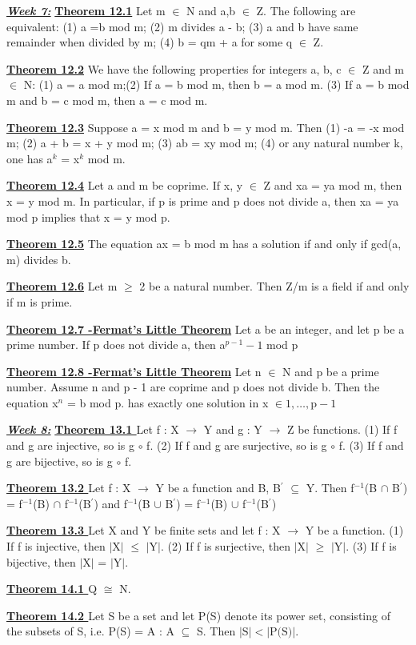 \documentclass[10pt]{article}
\begin{document}
\par\textbf{\underline{\textit{Week 7:}}}
\textbf{\underline{Theorem 12.1}}
Let m $\in$ N and a,b $\in$ Z. The following are equivalent:
(1) a =b mod m; (2) m divides a - b; (3) a and b have same remainder when divided by m; (4) b = qm + a for some q $\in$ Z.
\par\textbf{\underline{Theorem 12.2}}
We have the following properties for integers a, b, c $\in$ Z and m $\in$ N:
(1) a = a mod m;(2) If a = b mod m, then b = a mod m. (3) If a = b mod m and b = c mod m, then a = c mod m.
\par\textbf{\underline{Theorem 12.3}}
Suppose a = x mod m and b = y mod m. Then
(1) -a = -x mod m; (2) a + b = x + y mod m; (3) ab = xy mod m; (4) or any natural number k, one has a$^k$ = x$^k$ mod m.
\par\textbf{\underline{Theorem 12.4}}
Let a and m be coprime. If x, y $\in$ Z and xa = ya mod m, then x = y
mod m. In particular, if p is prime and p does not divide a, then xa = ya mod p implies
that x = y mod p.
\par\textbf{\underline{Theorem 12.5}}
The equation ax = b mod m has a solution if and only if gcd(a, m) divides
b.
\par\textbf{\underline{Theorem 12.6}}
Let m $\geq$ 2 be a natural number. Then Z/m is a field if and only if m is
prime.
\par\textbf{\underline{Theorem 12.7 -Fermat's Little Theorem}}
Let a be an integer, and let p be a prime
number. If p does not divide a, then
a$^{p-1}-1 $ mod p
\par\textbf{\underline{Theorem 12.8 -Fermat's Little Theorem}}
Let n $\in$ N and p be a prime number. Assume n and p - 1 are coprime and
p does not divide b. Then the equation x$^n$ = b mod p. has exactly one solution in x $\in {1, \dots ,\mbox{p}-1}$

\par\textbf{\underline{\textit{Week 8:}}}
\textbf{\underline{Theorem 13.1 }}
Let f : X $\rightarrow$ Y and g : Y $\rightarrow$ Z be functions.
(1) If f and g are injective, so is g $\circ$ f. (2)  If f and g are surjective, so is g $\circ$ f. (3) If f and g are bijective, so is g $\circ$ f.
\par\textbf{\underline{Theorem 13.2 }}
Let f : X $\rightarrow$ Y be a function and B, B$^\prime$ $\subseteq$ Y. Then
f$^{-1}$(B $\cap$ B$^\prime$) = f$^{-1}$(B) $\cap$ f$^{-1}$(B$^\prime$) and f$^{-1}$(B $\cup$ B$^\prime$) = f$^{-1}$(B) $\cup$ f$^{-1}$(B$^\prime$)
\par\textbf{\underline{Theorem 13.3 }}
Let X and Y be finite sets and let f : X $\rightarrow$ Y be a function.
(1) If f is injective, then $|\mbox{X}|$ $\leq$ $|\mbox{Y}|$. (2) If f is surjective, then $|\mbox{X}|$ $\geq$ $|\mbox{Y}|$. (3)  If f is bijective, then $|\mbox{X}|$ = $|\mbox{Y}|$.
\par\textbf{\underline{Theorem 14.1 }}
Q $\cong$ N.
\par\textbf{\underline{Theorem 14.2 }}
Let S be a set and let P(S) denote its power set, consisting of the subsets of
S, i.e. P(S) = {A : A $\subseteq$ S}. Then $|\mbox{S}| < |\mbox{P(S)}|$.
\end{document}
